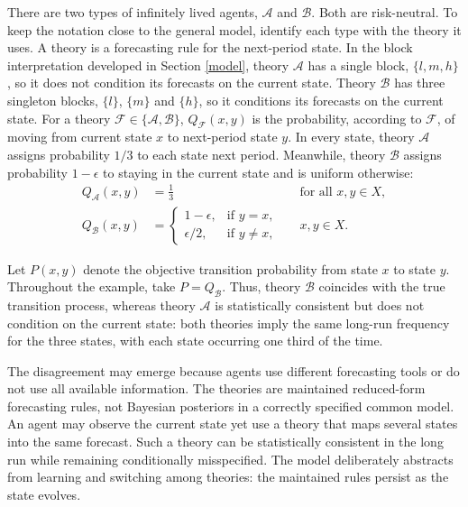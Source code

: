 \documentclass[11pt]{article}
\theoremstyle{plain}
\begin{document}
There are two types of infinitely lived agents, $\mathcal{A}$  and $\mathcal{B}$. Both are risk-neutral. To keep the notation close to the general model, identify each type with the theory it uses.
A theory is a forecasting rule for the next-period state. In the block interpretation developed in Section \ref{model}, theory $\mathcal{A}$ has a single block, $\{l,m,h\}$, so it does not condition its forecasts on the current state. Theory $\mathcal{B}$ has three singleton blocks, $\{l\}$, $\{m\}$ and $\{h\}$, so it conditions its forecasts on the current state. For a theory $\mathcal{F} \in \{\mathcal{A},\mathcal{B}\}$, $Q_{\mathcal{F}}(x,y)$ is the probability, according to $\mathcal{F}$, of moving from current state $x$ to next-period state $y$. In every state, theory $\mathcal{A}$ assigns probability $1/3$ to each state next period. Meanwhile, theory $\mathcal{B}$ assigns probability $1-\epsilon$ to staying in the current state and is uniform otherwise:
\begin{align}
Q_{\mathcal{A}}(x,y) &= \frac{1}{3} && \text{for all } x,y\in X, \label{eq:QAexample}\\
Q_{\mathcal{B}}(x,y) &=
\begin{cases}
1-\epsilon, & \text{if } y=x,\\
\epsilon/2, & \text{if } y\neq x,
\end{cases}
&& x,y\in X. \label{eq:QBexample}
\end{align}

Let $P(x,y)$ denote the objective transition probability from state $x$ to state $y$. Throughout the example, take $P=Q_{\mathcal{B}}$. Thus, theory $\mathcal{B}$ coincides with the true transition process, whereas theory $\mathcal{A}$ is statistically consistent but does not condition on the current state: both theories imply the same long-run frequency for the three states, with each state occurring one third of the time.

The disagreement may emerge because agents use different forecasting tools or do not use all available information. The theories are maintained reduced-form forecasting rules, not Bayesian posteriors in a correctly specified common model. An agent may observe the current state yet use a theory that maps several states into the same forecast. Such a theory can be statistically consistent in the long run while remaining conditionally misspecified. The model deliberately abstracts from learning and switching among theories: the maintained rules persist as the state evolves.
\end{document}
